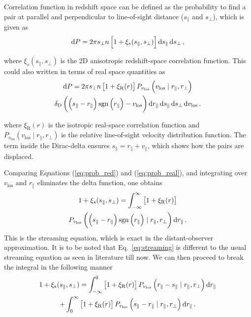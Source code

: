 \documentclass[a4paper,fleqn,usenatbib]{mnras}
\begin{document}
	Correlation function in redshift space can be defined as the probability to find a pair at parallel and perpendicular to line-of-sight distance ($s_{\parallel}$ and $s_{\perp}$), which is given as 
	\begin{eqnarray} \label{eq:prob_red}	
	\dif P = 2\pi s_{\perp} n \left[ 1+\xi_s(s_{\parallel}, s_{\perp})  \right]\dif s_{\parallel} \dif s_{\perp} \, , 
	\end{eqnarray}
	
	\noindent where $\displaystyle \xi_s(s_{\parallel}, s_{\perp})$ is the 2D anisotropic redshift-space correlation function. This could also written in terms of real space quantities as
	\begin{multline} \label{eq:prob_real}
	\dif P = 2\pi s_{\perp} n \left[ 1+\xi_{\mathrm{R}}(r) \right] P_{v_{\mathrm{los}}}\left(v_{\mathrm{los}}\mid r_{\parallel}, r_{\perp}\right) \\ 
	\delta_\mathrm{D}\left( \left(s_{\parallel} - r_{\parallel}\right)\mathrm{sgn}\left(r_{\parallel}\right) -v_{\mathrm{los}}\right) \dif r_{\parallel} \dif s_{\parallel} \dif s_{\perp} \dif v_{\mathrm{los}} \, .
	\end{multline}
	
	\noindent where $\displaystyle \xi_{\mathrm{R}}(r)$ is the isotropic real-space correlation function and $\displaystyle  P_{v_{\mathrm{los}}}\left(v_{\mathrm{los}}\mid r_{\parallel}, r_{\perp}\right)$ is the relative line-of-sight velocity distribution function. The term inside the Dirac-delta ensures $\displaystyle s_{\parallel} = r_{\parallel} + v_{\parallel}$, which shows how the pairs are displaced. 
	
	Comparing Equations (\ref{eq:prob_red}) and (\ref{eq:prob_real}), and integrating over $v_{\mathrm{los}}$ and $r_{\parallel}$ eliminates the delta function, one obtains
	\begin{multline} \label{eq:streaming}
	1 + \xi_s(s_{\parallel}, s_{\perp}) = \int_{-\infty}^{\infty}  \left[ 1 + \xi_{\mathrm{R}}(r) \right] \\ 
	P_{v_{\mathrm{los}}}\left(\left(s_{\parallel} - r_{\parallel}\right)\mathrm{sgn}\left(r_{\parallel}\right) \mid r_{\parallel}, r_{\perp}\right) \dif r_{\parallel} \, .
	\end{multline}
	\noindent This is the streaming equation, which is exact in the distant-observer approximation. It is to be noted that Eq.~\ref{eq:streaming} is different to the usual streaming equation as seen in literature till now. We can then proceed to break the integral in the following manner
	\begin{multline} \label{eq:streaming_break}
	1 + \xi_s(s_{\parallel}, s_{\perp}) = \int_{-\infty}^0  \left[ 1 + \xi_{\mathrm{R}}(r) \right] 
	P_{v_{\mathrm{los}}}\left(r_{\parallel} - s_{\parallel} \mid r_{\parallel}, r_{\perp}\right) \dif r_{\parallel} \\
	+ \int_0^{\infty} \left[ 1 + \xi_{\mathrm{R}}(r) \right] 
	P_{v_{\mathrm{los}}}\left(s_{\parallel} - r_{\parallel} \mid r_{\parallel}, r_{\perp}\right) \dif r_{\parallel} \, .
	\end{multline}
	
\end{document}
